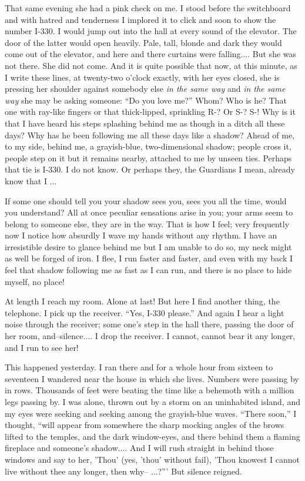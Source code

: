 \documentclass[11pt,openany]{book}
\begin{document}
That same evening she had a pink check on me. I stood before the switchboard and with hatred and tenderness I implored it to click and soon to show the number I-330. I would jump out into the hall at every sound of the elevator. The door of the latter would open heavily. Pale, tall, blonde and dark they would come out of the elevator, and here and there curtains were falling.... But she was not there. She did not come. And it is quite possible that now, at this minute, as I write these lines, at twenty-two o'clock exactly, with her eyes closed, she is pressing her shoulder against somebody else \emph{in the same way} and \emph{in the same way} she may be asking someone: ``Do you love me?'' Whom? Who is he? That one with ray-like fingers or that thick-lipped, sprinkling R-? Or S-? S-! Why is it that I have heard his steps splashing behind me as though in a ditch all these days? Why has he been following me all these days like a shadow? Ahead of me, to my side, behind me, a grayish-blue, two-dimensional shadow; people cross it, people step on it but it remains nearby, attached to me by unseen ties. Perhaps that tie is I-330. I do not know. Or perhaps they, the Guardians I mean, already know that I ...

If some one should tell you your shadow sees you, sees you all the time, would you understand? All at once peculiar sensations arise in you; your arms seem to belong to someone else, they are in the way. That is how I feel; very frequently now I notice how absurdly I wave my hands without any rhythm. I have an irresistible desire to glance behind me but I am unable to do so, my neck might as well be forged of iron. I flee, I run faster and faster, and even with my back I feel that shadow following me as fast as I can run, and there is no place to hide myself, no place!

At length I reach my room. Alone at last! But here I find another thing, the telephone. I pick up the receiver. ``Yes, I-330 please.'' And again I hear a light noise through the receiver; some one's step in the hall there, passing the door of her room, and--silence.... I drop the receiver. I cannot, cannot bear it any longer, and I run to see her!

This happened yesterday. I ran there and for a whole hour from sixteen to seventeen I wandered near the house in which she lives. Numbers were passing by in rows. Thousands of feet were beating the time like a behemoth with a million legs passing by. I was alone, thrown out by a storm on an uninhabited island, and my eyes were seeking and seeking among the grayish-blue waves. ``There soon,'' I thought, ``will appear from somewhere the sharp mocking angles of the brows lifted to the temples, and the dark window-eyes, and there behind them a flaming fireplace and someone's shadow.... And I will rush straight in behind those windows and say to her, 'Thou' (yes, 'thou' without fail), 'Thou knowest I cannot live without thee any longer, then why-- ...?''' But silence reigned.
\end{document}
